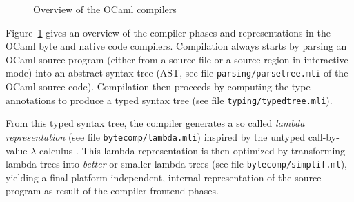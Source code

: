 \documentclass[10pt,a4paper,draft,twocolumn]{article}
\begin{document}
\begin{figure}[htb]
  \centering
  \caption{Overview of the OCaml compilers}
  \label{fig:Overview_of_the_OCaml_compilers}
\end{figure}

Figure~\ref{fig:Overview_of_the_OCaml_compilers} gives an overview of the compiler phases
and representations in the OCaml byte and native code compilers. Compilation always starts
by parsing an OCaml source program (either from a source file or a source region in
interactive mode) into an abstract syntax tree (AST, see file \texttt{parsing/parsetree.mli}
of the OCaml source code). Compilation then proceeds by computing the type annotations to
produce a typed syntax tree (see file \texttt{typing/typedtree.mli}).

From this typed syntax tree, the compiler generates a so called \emph{lambda representation} (see file
\texttt{bytecomp/lambda.mli}) inspired by the untyped call-by-value $\lambda$-calculus
\cite{Appel98ml,Jones87,Michaelson89}. This lambda representation is then optimized by
transforming lambda trees into \emph{better} or smaller lambda trees (see file
\texttt{bytecomp/simplif.ml}), yielding a final platform independent, internal
representation of the source program as result of the compiler frontend phases.
\end{document}
